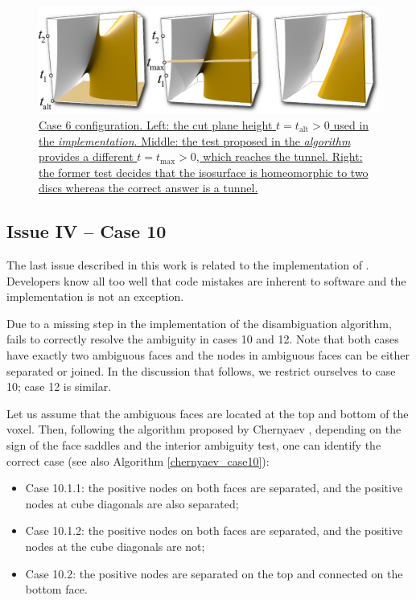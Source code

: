 \begin{figure}[b]
     \centering
    \includegraphics[width=0.95\linewidth]{chapter4/figures/height-plane-problem.png}
     \caption{\href{http://liscustodio.github.io/C_MC33/figure9.html}{\label{interior_test}Case 6 configuration.
     Left: the cut plane height $t = t_{\mathrm{alt}} > 0$ used in the \mc{} \emph{implementation}. Middle: the test proposed in the \mc{} \emph{algorithm} provides a different $t = t_{\mathrm{max}}> 0$, which reaches the tunnel. Right: the former test decides that the isosurface is homeomorphic to two discs whereas the correct answer is a tunnel.} \cite{lisOnline2013}}
\end{figure}

\subsection{Issue IV -- Case 10}
\label{erros_cause:lewiner}

The last issue described in this work is related to the implementation of \mc{}.
Developers know all too well that code mistakes are inherent to software and the \mc{} implementation is not an exception.

Due to a missing step in the implementation of the disambiguation algorithm, \mc{} fails to correctly resolve the ambiguity in cases 10 and 12. Note that both cases have exactly two ambiguous faces and the nodes in ambiguous faces can be either separated or joined. In the discussion that follows, we restrict ourselves to case 10; case 12 is similar. 

Let us assume that the ambiguous faces are located at the top and bottom of the voxel. Then, following the algorithm proposed by Chernyaev \cite{Chernyaev95marchingcubes}, depending on the sign of the face saddles and the interior ambiguity test, one can identify the correct case (see also Algorithm \ref{chernyaev_case10}):
\begin{itemize}
\item Case 10.1.1: the positive nodes on both faces are separated, and the positive nodes at cube diagonals are also separated;
\item Case 10.1.2: the positive nodes on both faces are separated, and the positive nodes at the cube diagonals are not;
\item Case 10.2: the positive nodes are separated on the top and connected on the bottom face.
\end{itemize}

